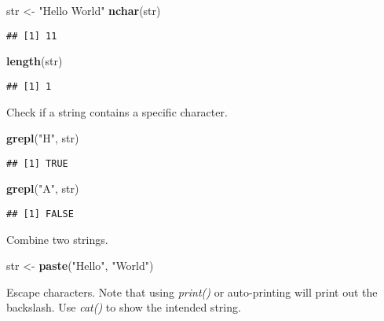 \documentclass[
  12pt,
]{article}
\newenvironment{Shaded}{\begin{snugshade}}{\end{snugshade}}
\newcommand{\FunctionTok}[1]{\textcolor[rgb]{0.13,0.29,0.53}{\textbf{#1}}}
\newcommand{\NormalTok}[1]{#1}
\newcommand{\OtherTok}[1]{\textcolor[rgb]{0.56,0.35,0.01}{#1}}
\newcommand{\StringTok}[1]{\textcolor[rgb]{0.31,0.60,0.02}{#1}}
\begin{document}
\begin{Shaded}
\begin{Highlighting}[]
\NormalTok{str }\OtherTok{\textless{}{-}} \StringTok{"Hello World"}
\FunctionTok{nchar}\NormalTok{(str)  }
\end{Highlighting}
\end{Shaded}

\begin{verbatim}
## [1] 11
\end{verbatim}

\begin{Shaded}
\begin{Highlighting}[]
\FunctionTok{length}\NormalTok{(str)}
\end{Highlighting}
\end{Shaded}

\begin{verbatim}
## [1] 1
\end{verbatim}

Check if a string contains a specific character.

\begin{Shaded}
\begin{Highlighting}[]
\FunctionTok{grepl}\NormalTok{(}\StringTok{"H"}\NormalTok{, str)}
\end{Highlighting}
\end{Shaded}

\begin{verbatim}
## [1] TRUE
\end{verbatim}

\begin{Shaded}
\begin{Highlighting}[]
\FunctionTok{grepl}\NormalTok{(}\StringTok{"A"}\NormalTok{, str)}
\end{Highlighting}
\end{Shaded}

\begin{verbatim}
## [1] FALSE
\end{verbatim}

Combine two strings.

\begin{Shaded}
\begin{Highlighting}[]
\NormalTok{str }\OtherTok{\textless{}{-}} \FunctionTok{paste}\NormalTok{(}\StringTok{"Hello"}\NormalTok{, }\StringTok{"World"}\NormalTok{)}
\end{Highlighting}
\end{Shaded}

Escape characters. Note that using \textit{print()} or auto-printing
will print out the backslash. Use \textit{cat()} to show the intended
string.
\end{document}
